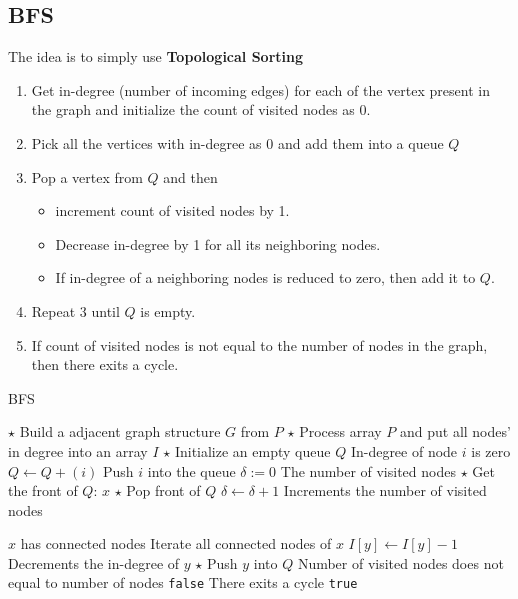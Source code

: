 \subsection{BFS}
The idea is to simply use \textbf{Topological Sorting}
\begin{enumerate}
    \item Get in-degree (number of incoming edges) for each of the vertex present in the graph and initialize the count of visited nodes as 0.
    \item Pick all the vertices with in-degree as 0 and add them into a queue $Q$
    \item Pop a vertex from $Q$ and then
    \begin{itemize}
        \item increment count of visited nodes by 1. 
        \item Decrease in-degree by 1 for all its neighboring nodes.
    \item If in-degree of a neighboring nodes is reduced to zero, then add it to $Q$.
\end{itemize}
\item Repeat 3 until $Q$ is empty.
\item If count of visited nodes is not equal to the number of nodes in the graph, then there exits a cycle.
\end{enumerate}
\begin{algorithm}[H]
\caption{BFS}
\begin{algorithmic}[1]
\State $\star$ Build a adjacent graph structure $G$ from $P$
\State $\star$ Process array $P$ and put all nodes' in degree into an array $I$
\State $\star$ Initialize an empty queue $Q$
 \Comment In-degree of node $i$ is zero
\State $Q\gets Q + (i)$ \Comment Push $i$ into the queue
\EndIf
\EndFor
\State $\delta:=0$ \Comment The number of visited nodes
\State $\star$ Get the front of $Q$: $x$
\State $\star$ Pop front of $Q$
\State $\delta\gets\delta+1$ \Comment Increments the number of visited nodes
\end{algorithmic}
\end{algorithm}
\begin{algorithm}[H]
\begin{algorithmic}[1]
 \Comment $x$ has connected nodes
 \Comment Iterate all connected nodes of $x$
\State $I[y]\gets I[y]-1$ \Comment Decrements the in-degree of $y$
\State $\star$ Push $y$ into $Q$
\EndIf
\EndIf
\EndFor
\EndIf
\EndWhile
{} \Comment Number of visited nodes does not equal to number of nodes
\State \Return \texttt{false} \Comment There exits a cycle
\Else
\State \Return \texttt{true}
\EndIf
\EndProcedure
\end{algorithmic}
\end{algorithm}
